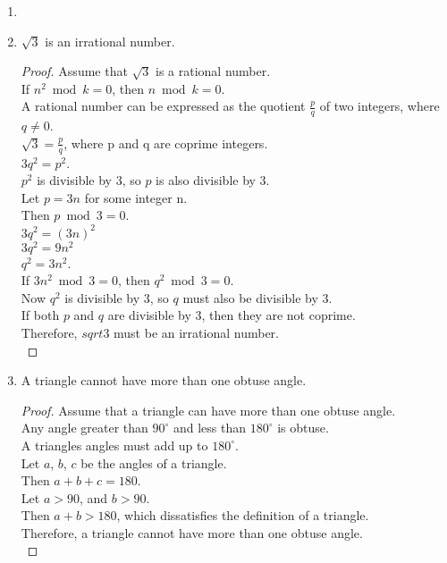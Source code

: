 \begin{enumerate}[leftmargin=2cm,labelsep=.5cm,label=\bf\arabic*.]
\item

\item
\begin{lemma}
$\sqrt{3}$ is an irrational number.
\end{lemma}
\begin{proof}
Assume that $\sqrt{3}$ is a rational number.\\
If $n^2 \bmod k = 0$, then $n \bmod k = 0$.\\
A rational number can be expressed as the quotient $\frac{p}{q}$ of two integers, where $q\neq 0$.\\[2mm]
$\sqrt{3}=\frac{p}{q}$, where p and q are coprime integers.\\
$3q^2 = p^2$.\\
$p^2$ is divisible by $3$, so $p$ is also divisible by $3$.\\
Let $p=3n$ for some integer n.\\
Then $p \bmod 3 = 0$.\\
$3q^2 = (3n)^2$\\
$3q^2 = 9n^2$\\
$q^2 = 3n^2$.\\
If $3n^2 \bmod 3 = 0$, then $q^2 \bmod 3 = 0$.\\[2mm]
Now $q^2$ is divisible by $3$, so $q$ must also be divisible by $3$.\\
If both $p$ and $q$ are divisible by $3$, then they are not coprime.\\
Therefore, $sqrt{3}$ must be an irrational number.\\[5mm]
\end{proof}

\item
\begin{lemma}
A triangle cannot have more than one obtuse angle.
\end{lemma}
\begin{proof}
Assume that a triangle can have more than one obtuse angle.\\
Any angle greater than $90^{\circ}$ and less than $180^{\circ}$ is obtuse.\\
A triangles angles must add up to $180^{\circ}$.\\[2mm]
Let $a$, $b$, $c$ be the angles of a triangle.\\
Then $a + b + c = 180$.\\
Let $a > 90$, and $b > 90$.\\[2mm]
Then $a + b > 180$, which dissatisfies the definition of a triangle.\\
Therefore, a triangle cannot have more than one obtuse angle.\\[5mm]
\end{proof}


\end{enumerate}
